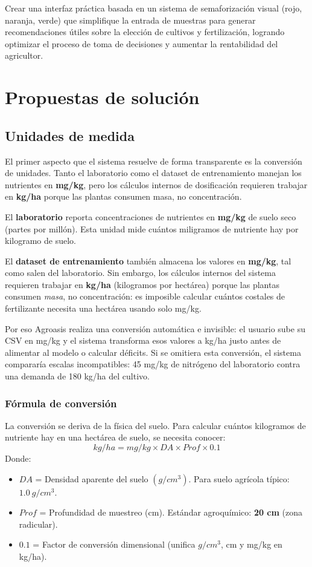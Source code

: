 \documentclass[12pt]{article}
\begin{document}
Crear una interfaz práctica basada en un sistema de semaforización visual (rojo, naranja, verde) que simplifique la entrada de muestras para generar recomendaciones útiles sobre la elección de cultivos y fertilización, logrando optimizar el proceso de toma de decisiones y aumentar la rentabilidad del agricultor.

\section{Propuestas de solución}

\subsection{Unidades de medida}
El primer aspecto que el sistema resuelve de forma transparente es la conversión de unidades. Tanto el laboratorio como el dataset de entrenamiento manejan los nutrientes en \textbf{mg/kg}, pero los cálculos internos de dosificación requieren trabajar en \textbf{kg/ha} porque las plantas consumen masa, no concentración.

El \textbf{laboratorio} reporta concentraciones de nutrientes en \textbf{mg/kg} de suelo seco (partes por millón). Esta unidad mide cuántos miligramos de nutriente hay por kilogramo de suelo.

El \textbf{dataset de entrenamiento} también almacena los valores en \textbf{mg/kg}, tal como salen del laboratorio. Sin embargo, los cálculos internos del sistema requieren trabajar en \textbf{kg/ha} (kilogramos por hectárea) porque las plantas consumen \textit{masa}, no concentración: es imposible calcular cuántos costales de fertilizante necesita una hectárea usando solo mg/kg.

Por eso Agroasis realiza una conversión automática e invisible: el usuario sube su CSV en mg/kg y el sistema transforma esos valores a kg/ha justo antes de alimentar al modelo o calcular déficits. Si se omitiera esta conversión, el sistema compararía escalas incompatibles: 45 mg/kg de nitrógeno del laboratorio contra una demanda de 180 kg/ha del cultivo.

\subsubsection{Fórmula de conversión}
La conversión se deriva de la física del suelo. Para calcular cuántos kilogramos de nutriente hay en una hectárea de suelo, se necesita conocer:
\[ kg/ha = mg/kg \times DA \times Prof \times 0.1 \]
Donde:
\begin{itemize}
    \item $DA$ = Densidad aparente del suelo \textbf{$(g/cm^3)$}. Para suelo agrícola típico: \textbf{$1.0\ g/cm^3$}.
    \item $Prof$ = Profundidad de muestreo (cm). Estándar agroquímico: \textbf{20 cm} (zona radicular).
    \item $0.1$ = Factor de conversión dimensional (unifica $g/cm^3$, cm y mg/kg en kg/ha).
\end{itemize}
\end{document}
